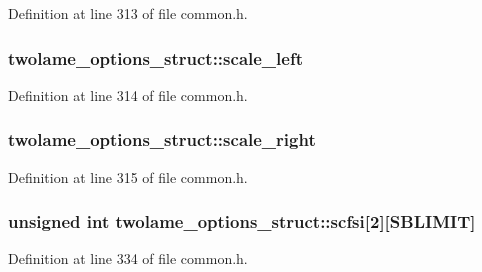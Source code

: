 Definition at line 313 of file common.\+h.

\subsubsection[{\texorpdfstring{scale\+\_\+left}{scale_left}}]{ twolame\+\_\+options\+\_\+struct\+::scale\+\_\+left}\hypertarget{structtwolame__options__struct_acd09bfe6ca734e4d883b02abc804f180}{}\label{structtwolame__options__struct_acd09bfe6ca734e4d883b02abc804f180}


Definition at line 314 of file common.\+h.

\subsubsection[{\texorpdfstring{scale\+\_\+right}{scale_right}}]{ twolame\+\_\+options\+\_\+struct\+::scale\+\_\+right}\hypertarget{structtwolame__options__struct_ae7aa58afe9d069bfe345675db235e30e}{}\label{structtwolame__options__struct_ae7aa58afe9d069bfe345675db235e30e}


Definition at line 315 of file common.\+h.

\subsubsection[{\texorpdfstring{scfsi}{scfsi}}]{\setlength{\rightskip}{0pt plus 5cm}unsigned {\bf int} twolame\+\_\+options\+\_\+struct\+::scfsi\mbox{[}2\mbox{]}\mbox{[}{\bf S\+B\+L\+I\+M\+IT}\mbox{]}}\hypertarget{structtwolame__options__struct_a6ea70e1aff6609b6451dfe9c98cbaa51}{}\label{structtwolame__options__struct_a6ea70e1aff6609b6451dfe9c98cbaa51}


Definition at line 334 of file common.\+h.

